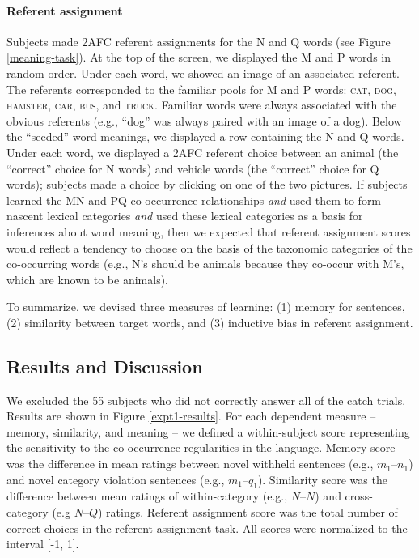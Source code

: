 \documentclass[man,floatsintext]{apa6}
\begin{document}
\paragraph{Referent assignment}
Subjects made 2AFC referent assignments for the N and Q words (see
Figure \ref{meaning-task}). At the top of the screen, we displayed the
M and P words in random order. Under each word, we showed an image of
an associated referent. The referents corresponded to the familiar
pools for M and P words: \textsc{cat}, \textsc{dog}, \textsc{hamster},
\textsc{car}, \textsc{bus}, and \textsc{truck}. Familiar words were
always associated with the obvious referents (e.g., ``dog'' was always
paired with an image of a dog). Below the ``seeded'' word meanings, we
displayed a row containing the N and Q words. Under each word, we
displayed a 2AFC referent choice between an animal (the ``correct''
choice for N words) and vehicle words (the ``correct'' choice for Q
words); subjects made a choice by clicking on one of the two
pictures. If subjects learned the MN and PQ co-occurrence
relationships \emph{and} used them to form nascent lexical categories
\emph{and} used these lexical categories as a basis for inferences
about word meaning, then we expected that referent assignment scores
would reflect a tendency to choose on the basis of the taxonomic
categories of the co-occurring words (e.g., N's should be animals
because they co-occur with M's, which are known to be animals).

To summarize, we devised three measures of learning: (1) memory for
sentences, (2) similarity between target words, and (3) inductive bias
in referent assignment.

\subsection{Results and Discussion}
We excluded the 55 subjects who did not correctly answer all of the
catch trials. Results are shown in Figure \ref{expt1-results}. For
each dependent measure -- memory, similarity, and meaning -- we
defined a within-subject score representing the sensitivity to the
co-occurrence regularities in the language. Memory score was the
difference in mean ratings between novel withheld sentences (e.g.,
$m_1$--$n_1$) and novel category violation sentences (e.g.,
$m_1$--$q_1$). Similarity score was the difference between mean
ratings of within-category (e.g., $N$--$N$) and cross-category (e.g
$N$--$Q$) ratings. Referent assignment score was the total number of
correct choices in the referent assignment task. All scores were
normalized to the interval [-1, 1].
\end{document}
